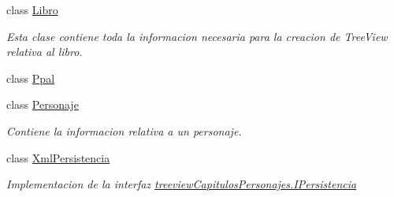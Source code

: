 \begin{DoxyCompactItemize}
class \hyperlink{classtreeview_capitulos_personajes_1_1_libro}{Libro}
\begin{DoxyCompactList}\small\item\em Esta clase contiene toda la informacion necesaria para la creacion de Tree\-View relativa al libro. \end{DoxyCompactList}\item 
class \hyperlink{classtreeview_capitulos_personajes_1_1_ppal}{Ppal}
\item 
class \hyperlink{classtreeview_capitulos_personajes_1_1_personaje}{Personaje}
\begin{DoxyCompactList}\small\item\em Contiene la informacion relativa a un personaje. \end{DoxyCompactList}\item 
class \hyperlink{classtreeview_capitulos_personajes_1_1_xml_persistencia}{Xml\-Persistencia}
\begin{DoxyCompactList}\small\item\em Implementacion de la interfaz \hyperlink{interfacetreeview_capitulos_personajes_1_1_i_persistencia}{treeview\-Capitulos\-Personajes.\-I\-Persistencia} \end{DoxyCompactList}\end{DoxyCompactItemize}
